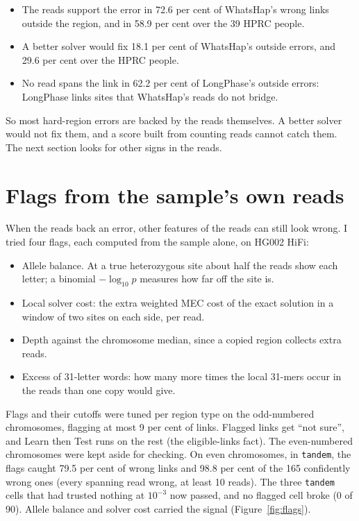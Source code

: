 \documentclass[11pt]{article}
\newcommand{\grp}[1]{\texttt{#1}}
\begin{document}
\begin{itemize}
\item The reads support the error in 72.6 per cent of WhatsHap's wrong links
  outside the region, and in 58.9 per cent over the 39 HPRC people.
\item A better solver would fix 18.1 per cent of WhatsHap's outside errors,
  and 29.6 per cent over the HPRC people.
\item No read spans the link in 62.2 per cent of LongPhase's outside errors:
  LongPhase links sites that WhatsHap's reads do not bridge.
\end{itemize}

So most hard-region errors are backed by the reads themselves. A better
solver would not fix them, and a score built from counting reads cannot
catch them. The next section looks for other signs in the reads.

\section{Flags from the sample's own reads}\label{sec:flags}

When the reads back an error, other features of the reads can still look
wrong. I tried four flags, each computed from the sample alone, on HG002
HiFi:

\begin{itemize}
\item Allele balance. At a true heterozygous site about half the reads show
  each letter; a binomial $-\log_{10}p$ measures how far off the site is.
\item Local solver cost: the extra weighted MEC cost of the exact solution
  in a window of two sites on each side, per read.
\item Depth against the chromosome median, since a copied region collects
  extra reads.
\item Excess of 31-letter words: how many more times the local 31-mers occur
  in the reads than one copy would give.
\end{itemize}

Flags and their cutoffs were tuned per region type on the odd-numbered
chromosomes, flagging at most 9 per cent of links. Flagged links get \enquote{not
sure}, and Learn then Test runs on the rest (the eligible-links fact). The
even-numbered chromosomes were kept aside for checking. On even chromosomes, in
\grp{tandem}, the flags caught 79.5 per cent of wrong links and 98.8 per
cent of the 165 confidently wrong ones (every spanning read wrong, at least
10 reads). The three \grp{tandem} cells that had trusted nothing at
$10^{-3}$ now passed, and no flagged cell broke (0 of 90). Allele balance
and solver cost carried the signal (Figure~\ref{fig:flags}).
\end{document}
